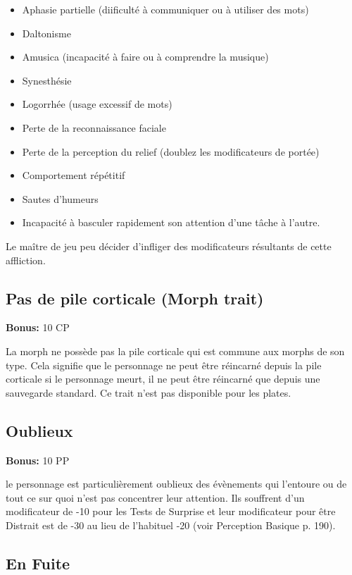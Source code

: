 \begin{itemize} \item Aphasie partielle (diificulté à communiquer ou à utiliser des mots) \item Daltonisme \item Amusica (incapacité à faire ou à comprendre la musique) \item Synesthésie \item Logorrhée (usage excessif de mots) \item Perte de la reconnaissance faciale \item Perte de la perception du relief (doublez les modificateurs de portée) \item Comportement répétitif \item Sautes d'humeurs \item Incapacité à basculer rapidement son attention d'une tâche à l'autre. \end{itemize} 

Le maître de jeu peu décider d'infliger des modificateurs résultants de cette affliction. 

\subsection{Pas de pile corticale (Morph trait)} \label{sec:traits-no-cortical-stack} 

\textbf{Bonus:} 10 CP 

La morph ne possède pas la pile corticale qui est commune aux morphs de son type. Cela signifie que le personnage ne peut être réincarné depuis la pile corticale si le personnage meurt, il ne peut être réincarné que depuis une sauvegarde standard. Ce trait n'est pas disponible pour les plates. 

\subsection{Oublieux} \label{sec:traits-oblivious} 

\textbf{Bonus:} 10 PP 

le personnage est particulièrement oublieux des évènements qui l'entoure ou de tout ce sur quoi n'est pas concentrer leur attention. Ils souffrent d'un modificateur de -10 pour les Tests de Surprise et leur modificateur pour être Distrait est de -30 au lieu de l'habituel -20 (voir Perception Basique p. 190). 

\subsection{En Fuite} \label{sec:traits-on-the-run} 

